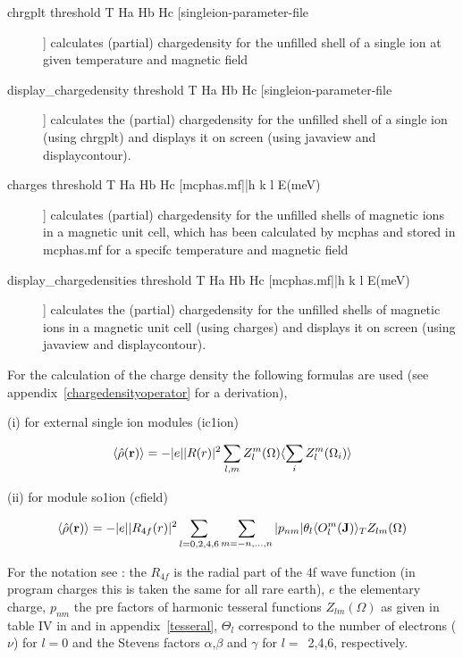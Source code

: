 \begin{description} 
\item [chrgplt  threshold T Ha Hb Hc [singleion-parameter-file]]
 calculates (partial) chargedensity for the unfilled shell of a single ion at given temperature and magnetic field
\item [display\_chargedensity  threshold T Ha Hb Hc [singleion-parameter-file]]
 calculates the (partial) chargedensity for the unfilled shell of a single ion (using {\prg chrgplt})
 and displays it on screen (using {\prg javaview} and {\prg displaycontour}).
\item [charges threshold T Ha Hb Hc [mcphas.mf||h k l E(meV)]]
 calculates (partial) chargedensity for the unfilled shells of magnetic ions in  a magnetic unit cell, which has been calculated by {\prg mcphas} and
 stored in {\prg mcphas.mf} for a specifc temperature and magnetic field
\item [display\_chargedensities threshold T Ha Hb Hc [mcphas.mf||h k l E(meV)]]
 calculates the (partial) chargedensity for the unfilled shells of magnetic ions in  a magnetic unit cell (using {\prg charges})
 and displays it on screen (using {\prg javaview} and {\prg displaycontour}).
\end{description}

   For the calculation of the charge density the following formulas are used (see %
appendix~\ref{chargedensityoperator} for a derivation), 

(i) for external single ion modules ({\prg ic1ion})
   
  \begin{equation}\label{chargedensity}
	       \langle \hat\rho(\mathbf r)\rangle=
	       -|e|  |R(r)|^2 \sum_{l,m}Z_l^{m}(\Omega) \langle\sum_i Z_l^{m}(\Omega_i)\rangle
   \end{equation} 
  
(ii) for module {\prg so1ion} ({\prg cfield})
   
   \begin{equation}\label{chargedensity_operator}
	       \langle \hat\rho(\mathbf r)\rangle=-|e||R_{4f}(r)|^2 \sum_{l=0,2,4,6}\sum_{m=-n,...,n}
	        |p_{nm}| \theta_{l} \langle O_l^m(\mathbf J)\rangle_T Z_{lm}(\Omega)
	      \end{equation}
		  
For the notation see \cite{hutchings64-227}: the $R_{4f}$ is the radial part of the
4f wave function (in program {\prg charges} this is taken the same for all
rare earth), $e$ the elementary charge, $p_{nm}$ the pre factors of harmonic tesseral
functions $Z_{lm}(\Omega)$ as given in table IV in \cite{hutchings64-227} and in appendix~\ref{tesseral}, %
$\Theta_l$
correspond to the number of electrons ($\nu$) for $l=0$
 and the Stevens factors $\alpha$,$\beta$ and $\gamma$ for $l=$~2,4,6, respectively.

